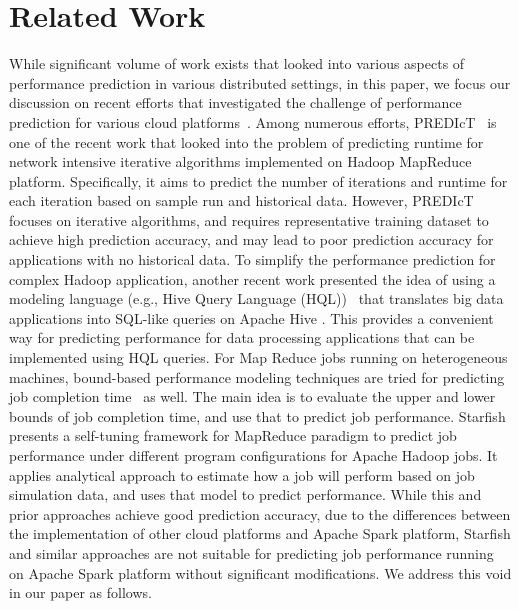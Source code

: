 \section{Related Work}
\label{related}

\noindent
While significant volume of work exists that looked into various aspects of performance prediction in various distributed settings, in this paper, we focus our discussion on recent efforts that investigated the challenge of performance prediction for various cloud platforms~\cite{predict, nosqlmodel, pmodel, starfish, oltp, prepare, cloudopt, cloudscale, dbseer, amml}. Among numerous efforts, PREDIcT~\cite{predict} is one of the recent work that looked into the problem of predicting runtime for network intensive iterative algorithms implemented on Hadoop MapReduce platform. Specifically, it aims to predict the number of iterations and runtime for each iteration based on sample run and historical data. However, PREDIcT focuses on iterative algorithms, and requires representative training dataset to achieve high prediction accuracy, and may lead to poor prediction accuracy for applications with no historical data. To simplify the performance prediction for complex Hadoop application, another recent work presented the idea of using a modeling language (e.g., Hive Query Language (HQL))~\cite{nosqlmodel} that translates big data applications into SQL-like queries on Apache Hive \cite{hive}. This provides a convenient way for predicting performance for data processing applications that can be implemented using HQL queries. For Map Reduce jobs running on heterogeneous machines, bound-based performance modeling techniques are tried for predicting job completion time~\cite{pmodel} as well. The main idea is to evaluate the upper and lower bounds of job completion time, and use that to predict job performance. Starfish~\cite{starfish} presents a self-tuning framework for MapReduce paradigm to predict job performance under different program configurations for Apache Hadoop jobs. It applies analytical approach to estimate how a job will perform based on job simulation data, and uses that model to predict performance. While this and prior approaches achieve good prediction accuracy, due to the differences between the implementation of other cloud platforms and Apache Spark platform, Starfish and similar approaches are not suitable for predicting job performance running on Apache Spark platform without significant modifications. We address this void in our paper as follows.

